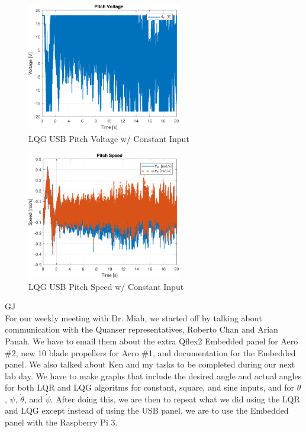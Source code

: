 \documentclass[fontsize=11pt, %
                             paper=letter, %
                             openany, %
                             captions=tableheading,
                             index=totoc,
                             hyperref]{labbook}
\begin{document}
\begin{addmargin}[0cm]{0cm}
\begin{figure}[h]
  \centering
  \includegraphics[width=0.6\textwidth]{figs/matlab/LQG/LQG_USB/Pitch_Volt_LQG_USB_CON}
  \caption{LQG USB Pitch Voltage w/ Constant Input}
  \label{fig:Pitch_Volt_LQG_USB_CON}
\end{figure}

\begin{figure}[h]
  \centering
  \includegraphics[width=0.6\textwidth]{figs/matlab/LQG/LQG_USB/Pitch_Speed_LQG_USB_CON}
  \caption{LQG USB Pitch Speed w/ Constant Input}
  \label{fig:Pitch_Speed_LQG_USB_CON}
\end{figure}

GJ\\
For our weekly meeting with Dr. Miah, we started off by talking about communication with the Quanser representatives, Roberto Chan and Arian Panah.  We have to email them about the extra Qflex2 Embedded panel for Aero \#2, new 10 blade propellers for Aero \#1, and documentation for the Embedded panel.  We also talked about Ken and my tasks to be completed during our next lab day.  We have to make graphs that include the desired angle and actual angles for both LQR and LQG algoritms for constant, square, and sine inputs, and for $\theta$, $\psi$, $\dot\theta$, and $\dot\psi$.  After doing this, we are then to repeat what we did using the LQR and LQG except instead of using the USB panel, we are to use the Embedded panel with the Raspberry Pi 3.


\end{addmargin}
\end{document}
